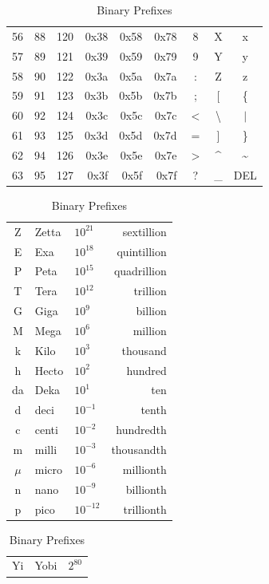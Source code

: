 \documentclass[12pt]{article}
\begin{document}
\begin{table}[H]
\begin{minipage}[t]{.55\linewidth}
\begin{tabular}{@{} r r r | >{\ttfamily}r >{\ttfamily}r >{\ttfamily}r | c c c @{}}
	56	& 88	& 120		& 0x38	& 0x58	& 0x78	& 8		& X 			& x\\
	57	& 89	& 121 	& 0x39	& 0x59	& 0x79	& 9		& Y 			& y\\
	58	& 90	& 122		& 0x3a	& 0x5a	& 0x7a	& :		& Z			& z\\
	59	& 91	& 123		& 0x3b	& 0x5b	& 0x7b	& ;		& [			& \{\\
	60	& 92	& 124		& 0x3c	& 0x5c	& 0x7c	& $<$	& \textbackslash	& $\vert$\\
	61	& 93	& 125		& 0x3d	& 0x5d	& 0x7d	& =		& ]			& \}\\
	62	& 94	& 126		& 0x3e	& 0x5e	& 0x7e	& $>$	& \^{}		& \~{}\\
	63	& 95	& 127		& 0x3f	& 0x5f	& 0x7f	& ?		& \_			& DEL\\
	\end{tabular}\end{minipage}\hfill
	\begin{minipage}[t]{.45\linewidth}
	\centering
	\caption{SI Prefixes \label{tab:SI PREFIXES}}
	\begin{tabular}{@{} c l l r @{}}\hline
	Z 	& Zetta	& $10^{21}$	& sextillion\\
	E 	& Exa		& $10^{18}$	& quintillion\\
	P 	& Peta	& $10^{15}$	& quadrillion\\
	T	& Tera	& $10^{12}$	& trillion\\
	G	& Giga	& $10^{9}$		& billion\\
	M	& Mega	& $10^{6}$		& million\\
	k	& Kilo	& $10^{3}$		& thousand\\
	h 	& Hecto	& $10^{2}$		& hundred\\
	da	& Deka	& $10^{1}$		& ten\\
	d 	& deci	& $10^{-1}$	& tenth\\
	c 	& centi	& $10^{-2}$	& hundredth\\
	m 	& milli	& $10^{-3}$	& thousandth\\
	$\mu$ & micro	& $10^{-6}$	& millionth\\
	n 	& nano	& $10^{-9}$	& billionth\\
	p 	& pico	& $10^{-12}$	& trillionth\\\hline
	\end{tabular}
	\centering
	\caption{Binary Prefixes \label{tab:BINARY PREFIXES}}
	\begin{tabular}{@{} c l l @{}}\hline
	Yi 	& Yobi	& $2^{80}$\\

\end{tabular}
\end{minipage}
\end{table}
\end{document}
